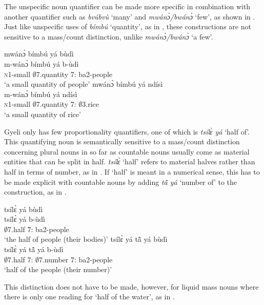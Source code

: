 The unspecific noun quantifier can be made more specific in  combination with another quantifier such as {\itshape bvúbvù} `many' and {\itshape mwánɔ̀/bwánɔ̀} `few', as shown in . Just like unspecific uses of {\itshape bímbú} `quantity', as in , these constructions are not sensitive to a mass/count distinction, unlike {\itshape mwánɔ̀/bwánɔ̀} `a few'.

\ea\label{bimbucomb}
\ea\label{bimbucomb1}
 \glll   mwánɔ̀  bímbú yá bùdì  \\
 m-wánɔ̀  bímbú yá b-ùdì  \\
 \textsc{n}1-small   $\emptyset$7.quantity 7:{\ATT} ba2-people  \\
    \trans `a small quantity of people'
\ex \label{bimbucomb2}
  \glll    mwánɔ̀ bímbú yá ndísì \\
  m-wánɔ̀ bímbú yá ndísì \\
              \textsc{n}1-small  $\emptyset$7.quantity 7:{\ATT} $\emptyset$3.rice \\
    \trans `a small quantity of rice'
\z
\z

Gyeli only has few proportionality quantifiers, one of which is {\itshape tsílɛ̀ yá} `half of'. This quantifying noun is semantically sensitive to a mass/count distinction concerning plural nouns in so far as countable nouns usually come as material entities that can be split in half.
{\itshape tsílɛ̀} `half' refers to material halves rather than half in terms of number, as in . If `half' is meant in a numerical sense, this has to be made explicit with countable nouns by adding {\itshape tã̂ yá} `number of' to the construction, as in .

\ea\label{tsile}
\ea\label{tsile1}
 \glll tsílɛ̀ yá bùdì  \\
 tsílɛ̀ yá b-ùdì  \\
          $\emptyset$7.half 7:{\ATT} ba2-people  \\
    \trans `the half of people (their bodies)'
\ex \label{tsile2}
  \glll    tsílɛ̀ yá tã̂ yá bùdì \\
  tsílɛ̀ yá tã̂ yá b-ùdì \\
              $\emptyset$7.half 7:{\ATT} $\emptyset$7.number 7:{\ATT} ba2-people \\
    \trans `half of the people (their number)'
\z
\z

This distinction does not have to be made, however, for liquid mass nouns where there is only one reading for `half of the water', as in .

